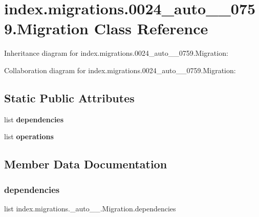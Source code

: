 \hypertarget{classindex_1_1migrations_1_10024__auto__20171026__0759_1_1Migration}{}\section{index.\+migrations.0024\+\_\+auto\+\_\+\_\+0759.Migration Class Reference}
\label{classindex_1_1migrations_1_10024__auto__20171026__0759_1_1Migration}


Inheritance diagram for index.\+migrations.0024\+\_\+auto\+\_\+\_\+0759.Migration\+:


Collaboration diagram for index.\+migrations.0024\+\_\+auto\+\_\+\_\+0759.Migration\+:
\subsection*{Static Public Attributes}
\begin{DoxyCompactItemize}
\item 
list {\bfseries dependencies}
\item 
list {\bfseries operations}
\end{DoxyCompactItemize}


\subsection{Member Data Documentation}
\mbox{\label{classindex_1_1migrations_1_10024__auto__20171026__0759_1_1Migration_ab1342b7d5b047852ffa843baf04d1df0}} 
\subsubsection{\texorpdfstring{dependencies}{dependencies}}
{\footnotesize\ttfamily list index.\+migrations.\+\_\+auto\+\_\+\_.\+Migration.\+dependencies\hspace{0.3cm}{\ttfamily [static]}}

